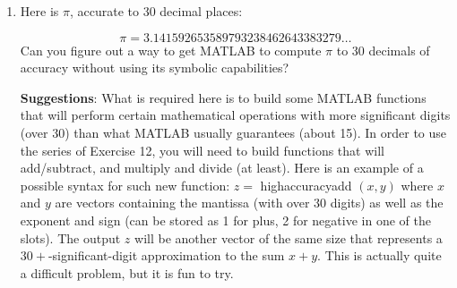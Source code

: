 \documentclass[../main.tex]{subfiles}
\begin{document}
\begin{enumerate}
(c) How many terms would we need to sum so that the (exact mathematical) error would be less than $10^{-30}$ ? Of course, MATLAB only uses 16-digit floating point arithmetic so we could not directly use it to get such an approximation to $\pi$ (Unless we used the symbolic toolbox; see Appendix A).

\item Here is $\pi$, accurate to 30 decimal places:

$$
\pi=3.141592653589793238462643383279 \ldots
$$
Can you figure out a way to get MATLAB to compute $\pi$ to 30 decimals of accuracy without using its symbolic capabilities?

\textbf{Suggestions}: What is required here is to build some MATLAB functions that will perform certain mathematical operations with more significant digits (over 30) than what MATLAB usually guarantees (about 15). In order to use the series of Exercise 12, you will need to build functions that will add/subtract, and multiply and divide (at least). Here is an example of a possible syntax for such new function: $z=$ highaccuracyadd $(x, y)$ where $x$ and $y$ are vectors containing the mantissa (with over 30 digits) as well as the exponent and sign (can be stored as 1 for plus, 2 for negative in one of the slots). The output $z$ will be another vector of the same size that represents a $30+$-significant-digit approximation to the sum $x+y$. This is actually quite a difficult problem, but it is fun to try.


\end{enumerate}
\end{document}
